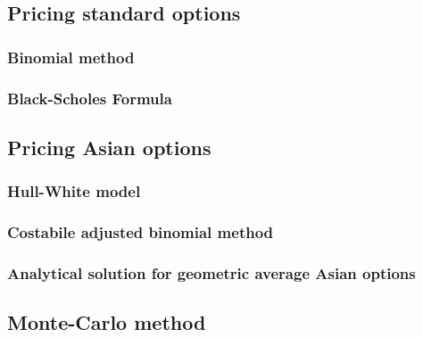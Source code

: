 \subsection{Pricing standard options}

\subsubsection{Binomial method}

\subsubsection{Black-Scholes Formula}

\subsection{Pricing Asian options}

\subsubsection{Hull-White model}

\subsubsection{Costabile adjusted binomial method}

\subsubsection{Analytical solution for geometric average Asian options}

\subsection{Monte-Carlo method}